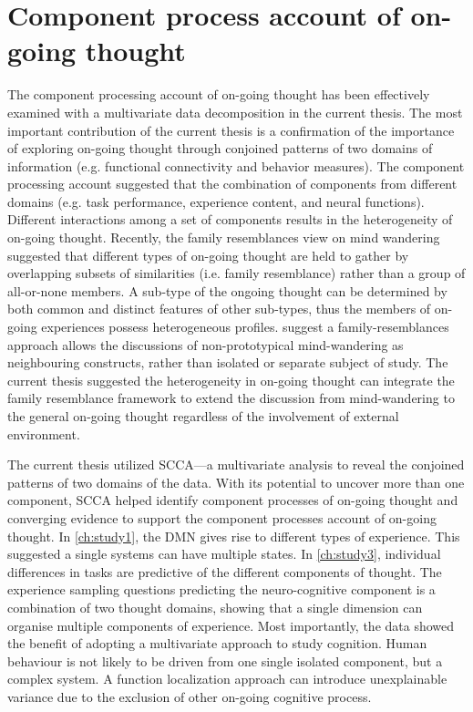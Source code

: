 
\section{Component process account of on-going thought}
\label{ch:discussion:components}

The component processing account of on-going thought \cite{SmallwoodSchooler2015} has been effectively examined with a multivariate data decomposition in the current thesis. The most important contribution of the current thesis is a confirmation of the importance of exploring on-going thought through conjoined patterns of two domains of information (e.g. functional connectivity and behavior measures). The component processing account suggested that the combination of components from different domains (e.g. task performance, experience content, and neural functions). Different interactions among a set of components results in the heterogeneity of on-going thought. Recently, the family resemblances view on mind wandering \cite{Seli2018} suggested that different types of on-going thought are held to gather by overlapping subsets of similarities (i.e. family resemblance) rather than a group of all-or-none members. A sub-type of the ongoing thought can be determined by both common and distinct features of other sub-types, thus the members of on-going experiences possess heterogeneous profiles.  suggest a family-resemblances approach allows the discussions of non-prototypical mind-wandering as neighbouring constructs, rather than isolated or separate subject of study. The current thesis suggested the heterogeneity in on-going thought can integrate the family resemblance framework to extend the discussion from mind-wandering to the general on-going thought regardless of the involvement of external environment. 

The current thesis utilized SCCA---a multivariate analysis to reveal the conjoined patterns of two domains of the data. With its potential to uncover more than one component, SCCA helped identify component processes of on-going thought and converging evidence to support the component processes account of on-going thought. In \cref{ch:study1}, the DMN gives rise to different types of experience. This suggested  a single systems can have multiple states. In \cref{ch:study3}, individual differences in tasks are predictive of the different components of thought. The experience sampling questions predicting the neuro-cognitive component is a combination of two thought domains, showing that a single dimension can organise multiple components of experience. Most importantly, the data showed the benefit of adopting a multivariate approach to study cognition. Human behaviour is not likely to be driven from one single isolated component, but a complex system. A function localization approach can introduce unexplainable variance due to the exclusion of other on-going cognitive process. 


